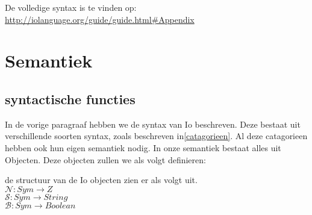 \documentclass[12pt]{article}
\begin{document}
De volledige syntax is te vinden op: \url{http://iolanguage.org/guide/guide.html#Appendix}

\section{Semantiek}

\subsection{syntactische functies}
In de vorige paragraaf hebben we de syntax van Io beschreven. Deze bestaat uit verschillende soorten syntax, zoals beschreven in\ref{catagorieen}.
Al deze catagorieen hebben ook hun eigen semantiek nodig. 
In onze semantiek bestaat alles uit Objecten. Deze objecten zullen we als volgt definieren:

%
%
% 

de structuur van de Io objecten zien er als volgt uit. \\
$\mathcal{N}: Sym \rightarrow Z $ \\
$\mathcal{S}: Sym \rightarrow String $ \\
$\mathcal{B}: Sym \rightarrow Boolean $ \\
\end{document}
